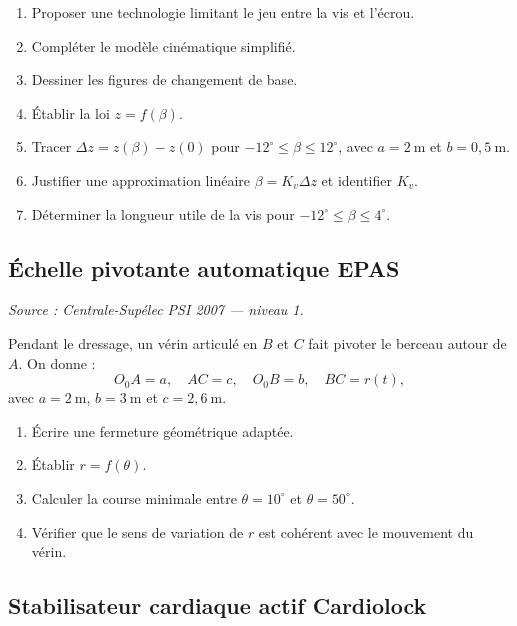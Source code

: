 \begin{center}
\hfill
{}
\end{center}

\begin{enumerate}
  \item Proposer une technologie limitant le jeu entre la vis et l'écrou.
  \item Compléter le modèle cinématique simplifié.
  \item Dessiner les figures de changement de base.
  \item Établir la loi $z=f(\beta)$.
  \item Tracer $\Delta z=z(\beta)-z(0)$ pour $-12^\circ\leq\beta\leq12^\circ$, avec $a=2\ \mathrm m$ et $b=0{,}5\ \mathrm m$.
  \item Justifier une approximation linéaire $\beta=K_v\Delta z$ et identifier $K_v$.
  \item Déterminer la longueur utile de la vis pour $-12^\circ\leq\beta\leq4^\circ$.
\end{enumerate}

\subsection{Échelle pivotante automatique EPAS}

\textit{Source : Centrale-Supélec PSI 2007 — niveau 1.}

Pendant le dressage, un vérin articulé en $B$ et $C$ fait pivoter le
berceau autour de $A$. On donne :
\[
O_0A=a,\quad AC=c,\quad O_0B=b,\quad BC=r(t),
\]
avec $a=2\ \mathrm m$, $b=3\ \mathrm m$ et $c=2{,}6\ \mathrm m$.

\TLEPASGeometry

\begin{enumerate}
  \item Écrire une fermeture géométrique adaptée.
  \item Établir $r=f(\theta)$.
  \item Calculer la course minimale entre $\theta=10^\circ$ et $\theta=50^\circ$.
  \item Vérifier que le sens de variation de $r$ est cohérent avec le mouvement du vérin.
\end{enumerate}

\subsection{Stabilisateur cardiaque actif Cardiolock}


